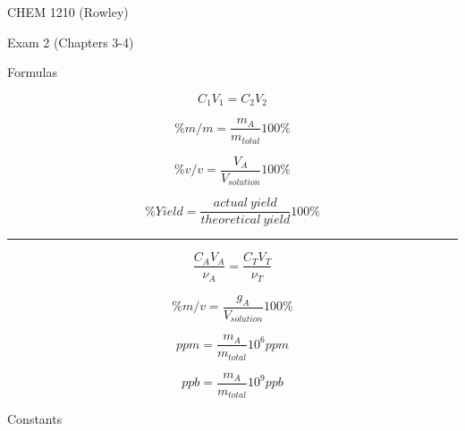 \documentclass[12pt, addpoints, letterpaper]{exam}
\begin{document}
\begin{center}
	\vspace{12em}
	{\Huge CHEM 1210 (Rowley) }

	{\LARGE Exam 2 (Chapters 3-4)}
\end{center}


\begin{center}
	{\large Formulas}

	\hrulefill
\end{center}

\noindent
\begin{minipage}[c][\stretch{1}][c]{0.48\linewidth}
	\begin{equation*}
		C_1V_1=C_2V_2
	\end{equation*}

	\begin{equation*}
		\%m/m=\dfrac{m_A}{m_{total}}100\%
	\end{equation*}

	\begin{equation*}
		\%v/v=\dfrac{V_A}{V_{solution}}100\%
	\end{equation*}

	\begin{equation*}
		\%Yield=\frac{actual~yield}{theoretical~yield}100\%
	\end{equation*}
\end{minipage}
\rule[-100pt]{1.5pt}{200pt}
\begin{minipage}[c][\stretch{1}][c]{0.5\linewidth}
	\begin{equation*}
		\dfrac{C_AV_A}{\nu_A}=\dfrac{C_TV_T}{\nu_T}
	\end{equation*}

	\begin{equation*}
		\%m/v=\dfrac{g_A}{V_{solution}}100\%
	\end{equation*}

	\begin{equation*}
		ppm=\dfrac{m_A}{m_{total}}10^6ppm
	\end{equation*}

	\begin{equation*}
		ppb=\dfrac{m_A}{m_{total}}10^9ppb
	\end{equation*}
\end{minipage}

\begin{center}
	{\large Constants}

	\hrulefill
\end{center}
\end{document}
